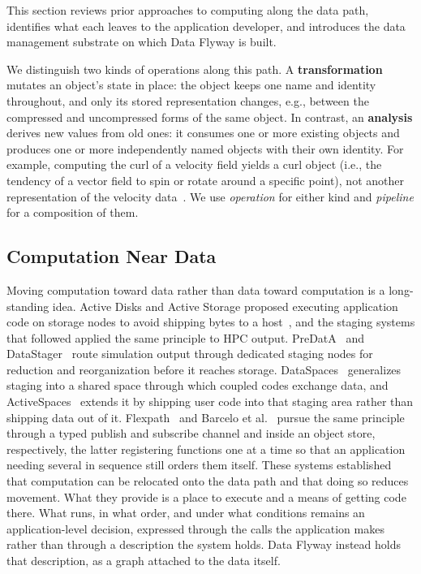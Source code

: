 This section reviews prior approaches to computing along the data path, identifies what each leaves to the application developer, and introduces the data management substrate on which Data Flyway is built.

We distinguish two kinds of operations along this path. A \textbf{transformation} mutates an object's state in place: the object keeps one name and identity throughout, and only its stored representation changes, e.g., between the compressed and uncompressed forms of the same object. In contrast, an \textbf{analysis} derives new values from old ones: it consumes one or more existing objects and produces one or more independently named objects with their own identity. For example, computing the curl of a velocity field yields a curl object (i.e., the tendency of a vector field to spin or rotate around a specific point), not another representation of the velocity data~\cite{prabhat2012teca}. We use \emph{operation} for either kind and \emph{pipeline} for a composition of them.

\subsection{Computation Near Data}

Moving computation toward data rather than data toward computation is a long-standing idea. Active Disks and Active Storage proposed executing application code on storage nodes to avoid shipping bytes to a host~\cite{acharya1998activedisks, riedel1998activestorage}, and the staging systems that followed applied the same principle to HPC output. PreDatA~\cite{zheng2010predata} and DataStager~\cite{abbasi2009datastager} route simulation output through dedicated staging nodes for reduction and reorganization before it reaches storage. DataSpaces~\cite{docan2012dataspaces} generalizes staging into a shared space through which coupled codes exchange data, and ActiveSpaces~\cite{docan2015activespaces} extends it by shipping user code into that staging area rather than shipping data out of it. Flexpath~\cite{flexpath} and Barcelo et al.~\cite{barcelo2022revisiting} pursue the same principle through a typed publish and subscribe channel and inside an object store, respectively, the latter registering functions one at a time so that an application needing several in sequence still orders them itself. These systems established that computation can be relocated onto the data path and that doing so reduces movement. What they provide is a place to execute and a means of getting code there. What runs, in what order, and under what conditions remains an application-level decision, expressed through the calls the application makes rather than through a description the system holds. Data Flyway instead holds that description, as a graph attached to the data itself.

